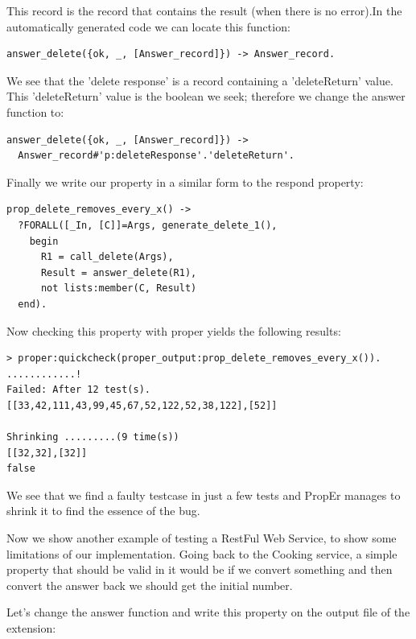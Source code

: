 \documentclass[submission,copyright,a4]{eptcs}
\begin{document}
This record is the record that contains the result (when there is no error).In the automatically generated code we can locate this function:

\begin{lstlisting}
answer_delete({ok, _, [Answer_record]}) -> Answer_record.
\end{lstlisting}

We see that the 'delete response' is a record containing a 'deleteReturn' value. This 'deleteReturn' value is the boolean we seek; therefore we change the answer function to:

\begin{lstlisting}
answer_delete({ok, _, [Answer_record]}) ->
  Answer_record#'p:deleteResponse'.'deleteReturn'.
\end{lstlisting}

Finally we write our property in a similar form to the respond property:

\begin{lstlisting}
prop_delete_removes_every_x() ->
  ?FORALL([_In, [C]]=Args, generate_delete_1(),
    begin
      R1 = call_delete(Args),
      Result = answer_delete(R1),
      not lists:member(C, Result)
  end).
\end{lstlisting}


Now checking this property with proper yields the following results:

\begin{lstlisting}
> proper:quickcheck(proper_output:prop_delete_removes_every_x()).
............!
Failed: After 12 test(s).
[[33,42,111,43,99,45,67,52,122,52,38,122],[52]]

Shrinking .........(9 time(s))
[[32,32],[32]]
false
\end{lstlisting}

We see that we find a faulty testcase in just a few tests and PropEr manages to shrink it to find the essence of the bug.

Now we show another example of testing a RestFul Web Service, to show some limitations of our implementation. Going back to the Cooking service, a simple property that should be valid in it would be if we convert something and then convert the answer back we should get the initial number.

Let's change the answer function and write this property on the output file of the extension:
\end{document}
